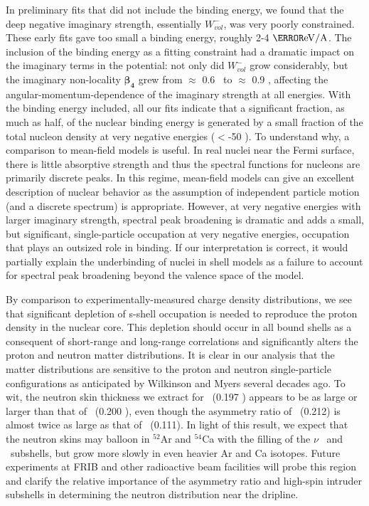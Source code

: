 In preliminary fits that did not include the binding energy,
we found that the deep negative imaginary strength, essentially $W_{vol}^{-}$,
was very poorly constrained. These early fits gave too small a binding energy,
roughly 2-4 $\mega\electronvolt/\text{A}$.
The inclusion of the binding energy as a fitting constraint
had a dramatic impact on the imaginary terms in the potential: not only did
$W_{vol}^{-}$ grow considerably,
but the imaginary non-locality $\bm{\beta_{4}}$ grew from $\approx$
0.6 \femto\meter\ to $\approx$ 0.9 \femto\meter, affecting the
angular-momentum-dependence of the imaginary strength at all energies.
With the binding energy included, all our fits indicate that a significant
fraction, as much as half, of the nuclear binding energy is generated by a small
fraction of the total nucleon density at very negative energies ($<$-50 \mega\electronvolt).
To understand why, a comparison to mean-field models is useful.
In real nuclei near the Fermi surface, there is
little absorptive strength and thus the spectral functions for nucleons are
primarily discrete peaks. In this regime,
mean-field models can give an excellent description of nuclear behavior as the
assumption of independent particle motion (and a discrete spectrum) is appropriate.
However, at very negative energies with larger imaginary strength,
spectral peak broadening is dramatic and adds a small, but significant,
single-particle occupation at very negative energies, occupation
that plays an outsized role in binding. If our interpretation is
correct, it would partially explain the underbinding of
nuclei in shell models as a failure to account for spectral peak broadening
beyond the valence space of the model.

By comparison to experimentally-measured charge density distributions, we see 
that significant depletion of s-shell occupation is needed to reproduce the
proton density in the nuclear core. This depletion should occur in all bound
shells as a consequent of short-range and long-range correlations and
significantly alters the proton and neutron matter distributions.
It is clear in our analysis that the matter distributions are sensitive
to the proton and neutron single-particle configurations as anticipated by
Wilkinson \cite{Wilkinson1967} and Myers \cite{Myers1969} several decades ago.
To wit, the neutron skin thickness we
extract for \oEight\ (0.197 \femto\meter) appears
to be as large or larger than that of
\pbEight\ (0.200 \femto\meter), even though the asymmetry ratio of \pbEight\
(0.212) is almost twice as large as that of \oEight\ (0.111). In light of this
result, we expect that the neutron skins may balloon in $^{52}$Ar and $^{54}$Ca
with the filling of the $\nu$ \fSeven\ and \fFive\ subshells, but grow more slowly
in even heavier Ar and Ca isotopes. Future experiments at FRIB and other
radioactive beam facilities will probe this region and clarify the relative
importance of the asymmetry ratio and high-spin intruder subshells in determining
the neutron distribution near the dripline.

